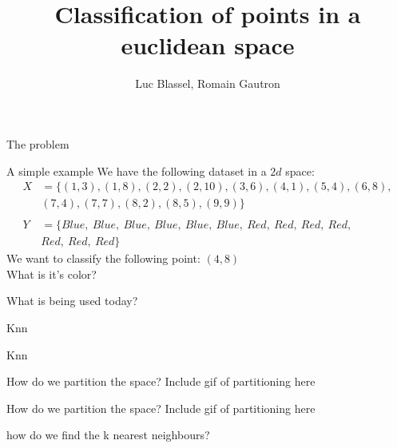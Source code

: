 \documentclass[11 pt]{beamer}
\title{Classification of points in a euclidean space}
\author{Luc Blassel, Romain Gautron}
\begin{document}
\maketitle

\begin{frame}{The problem}

\end{frame}

\begin{frame}[c]{A simple example}
  We have the following dataset in a $2d$ space:
  \begin{align*}
    X &=\{(1, 3),(1, 8), (2, 2), (2, 10), (3, 6), (4, 1), (5, 4), (6, 8), \\&(7, 4), (7, 7), (8, 2), (8, 5), (9, 9)\}\\
    &\\
    Y &= \{Blue,\ Blue,\ Blue,\ Blue,\ Blue,\ Blue,\ Red,\ Red,\ Red,\ Red,\ \\& Red,\ Red,\ Red \}
  \end{align*}
  We want to classify the following point: $(4,8)$\\
  What is it's color?
\end{frame}

\begin{frame}{What is being used today?}

\end{frame}

\begin{frame}{Knn}

\end{frame}

\begin{frame}{Knn}

\end{frame}

\begin{frame}{How do we partition the space?}
  Include gif of partitioning here
\end{frame}

\begin{frame}{How do we partition the space?}
  Include gif of partitioning here
\end{frame}

\begin{frame}{how do we find the k nearest neighbours?}

\end{frame}
\end{document}
